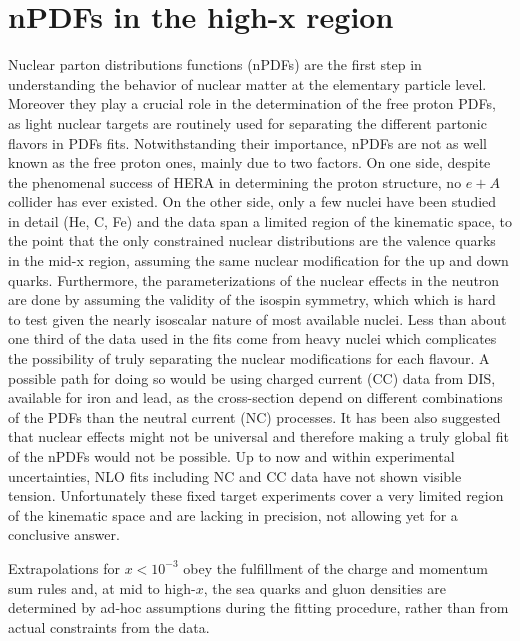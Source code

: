 


%
\section{nPDFs in the high-x region}

Nuclear parton distributions functions (nPDFs) are the first step in understanding the behavior of nuclear matter at the elementary particle level. Moreover they play a crucial role in the determination of the free proton PDFs, as light nuclear targets are routinely used for separating the different partonic flavors in PDFs fits. Notwithstanding their importance, nPDFs are not as well known as the free proton ones, mainly due to two factors. On one side, despite the phenomenal success of HERA in determining the proton structure, no $e+A$ collider has ever existed. On the other side, only a few nuclei have been studied in detail (He, C, Fe) and the data span a limited region of the kinematic space, to the point that the only constrained nuclear distributions are the valence quarks in the mid-x region, assuming the same nuclear modification for the up and down quarks. Furthermore, the parameterizations of the nuclear effects in the neutron are done by assuming the validity of the isospin symmetry, which which is hard to test given the nearly isoscalar nature of most available nuclei.  Less than about one third of the data used in the fits come from heavy nuclei which complicates the possibility of truly separating the nuclear modifications for each flavour. A possible path for doing so would be using charged current (CC) data from DIS, available for iron and lead, as the cross-section depend on different combinations of the PDFs than the neutral current (NC) processes. It has been also suggested that nuclear effects might not be universal and therefore making a truly global fit of the nPDFs would not be possible. Up to now and within experimental uncertainties, NLO fits including NC and CC data have not shown visible tension. Unfortunately these fixed target experiments cover a very limited region of the kinematic space and are lacking in precision, not allowing yet for a conclusive answer.


 Extrapolations for $x < 10^{-3}$ obey the fulfillment of the charge and momentum sum rules and, at mid to high-$x$, the sea quarks and gluon densities are determined by ad-hoc assumptions during the fitting procedure, rather than from actual constraints from the data. 

